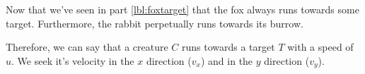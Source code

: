 Now that we've seen in part \ref{lbl:foxtarget} that the fox always runs towards some target. Furthermore, the rabbit perpetually runs towards its burrow. 

Therefore, we can say that a creature $C$ runs towards a target $T$ with a speed of $u$. We seek it's velocity in the $x$ direction ($v_x$) and in the $y$ direction ($v_y$).

\begin{figure}[h]
\centering
{}
\end{figure}